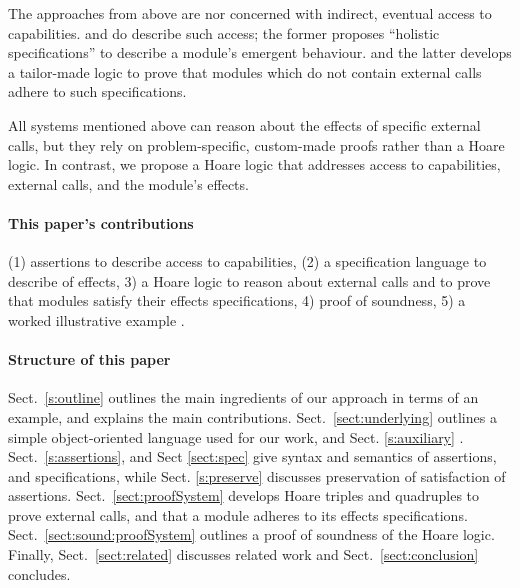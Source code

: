  The approaches from above %
 are nor concerned with indirect, eventual access to capabilities.
\citet{FASE} and \citet{OOPSLA22} do describe such access; %
  the former proposes  ``holistic specifications'' to describe a module's emergent behaviour. 
and the latter develops 
a tailor-made logic to prove that modules which do not contain external calls adhere to such specifications.

\vspace{.1cm}

All  systems mentioned above can reason about the effects of specific external calls, but they rely on problem-specific, custom-made proofs rather than a Hoare logic.
 In contrast, we propose a Hoare logic that addresses access to capabilities, external calls, and the module's \tamed effects.

  
\paragraph{This paper's contributions} %
{(1) assertions to describe   access to capabilities}, 
(2) a specification language to describe \taming of effects,
3) a Hoare logic to reason about external calls and to prove that modules satisfy their \tamed effects specifications,
4)  proof of soundness,
5) a worked illustrative example .
 

 \paragraph{Structure of this paper}
Sect.\ \ref{s:outline}   outlines the main ingredients of our approach in terms of an example, and explains the main contributions.
Sect.\ \ref{sect:underlying} outlines a simple object-oriented language used for our work, and Sect. \ref{s:auxiliary} .
Sect.\ \ref{s:assertions}, and Sect \ref{sect:spec}  give syntax and semantics of assertions, and  specifications,
{while Sect. \ref{s:preserve} discusses preservation of satisfaction of assertions.}
Sect.\ \ref{sect:proofSystem} develops Hoare triples and quadruples to prove external calls, and that a module adheres to its \tamed effects specifications.
Sect.\ \ref{sect:sound:proofSystem} outlines a proof of soundness of
the Hoare logic. Finally, Sect.\ \ref{sect:related} discusses related
work and Sect.\ \ref{sect:conclusion} concludes. 
 
